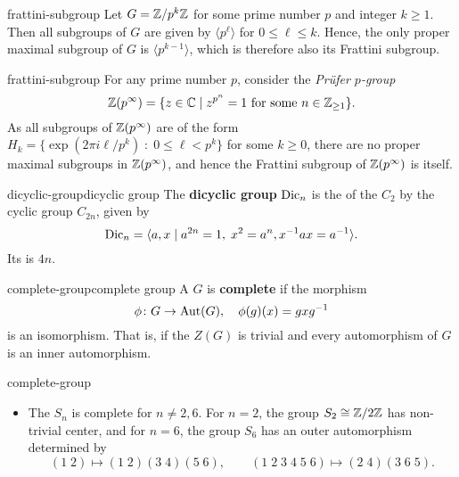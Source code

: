 \begin{example}{frattini-subgroup}
    Let $G = \mathbb{Z}/p^k \mathbb{Z}$ for some prime number $p$ and integer $k \ge 1$. Then all subgroups of $G$ are given by $\langle p^\ell \rangle$ for $0 \le \ell \le k$. Hence, the only proper maximal subgroup of $G$ is $\langle p^{k - 1} \rangle$, which is therefore also its Frattini subgroup.
\end{example}

\begin{example}{frattini-subgroup}
    For any prime number $p$, consider the \textit{Prüfer $p$-group}
    \[ \mathbb{Z}(p^\infty) = \{ z \in \mathbb{C} \mid z^{p^n} = 1 \textup{ for some } n \in \mathbb{Z}_{\ge 1} \} . \]
    As all subgroups of $\mathbb{Z}(p^\infty)$ are of the form $H_k = \{ \exp(2 \pi i \ell / p^k) \;:\; 0 \le \ell < p^k \}$ for some $k \ge 0$, there are no proper maximal subgroups in $\mathbb{Z}(p^\infty)$, and hence the Frattini subgroup of $\mathbb{Z}(p^\infty)$ is itself.
\end{example}

\begin{topic}{dicyclic-group}{dicyclic group}
    The \textbf{dicyclic group} $\textup{Dic}_n$ is the  of the  $C_2$ by the cyclic group $C_{2n}$, given by
    \[ \textup{Dic}_n = \langle a, x \mid a^{2n} = 1, \; x^2 = a^n, x^{-1} a x = a^{-1} \rangle . \]
    Its  is $4n$.
\end{topic}

\begin{topic}{complete-group}{complete group}
    A  $G$ is \textbf{complete} if the morphism
    \[ \phi \colon G \to \textup{Aut}(G), \quad \phi(g)(x) = g x g^{-1} \]
    is an isomorphism. That is, if the  $Z(G)$ is trivial and every automorphism of $G$ is an inner automorphism.
\end{topic}

\begin{example}{complete-group}
    \begin{itemize}
        \item The  $S_n$ is complete for $n \ne 2, 6$. For $n = 2$, the group $S_2 \cong \mathbb{Z}/2\mathbb{Z}$ has non-trivial center, and for $n = 6$, the group $S_6$ has an outer automorphism determined by
        \[ (1 \; 2) \mapsto (1 \; 2)(3 \; 4) (5 \; 6), \qquad (1 \; 2 \; 3 \; 4 \; 5 \; 6) \mapsto (2 \; 4) (3 \; 6 \; 5) . \]
    \end{itemize}
\end{example}

